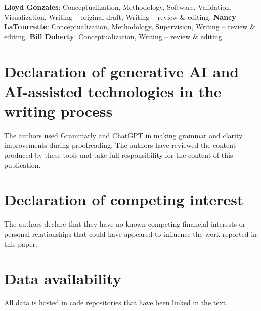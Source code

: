 \documentclass[final,5p,times,twocolumn]{elsarticle}
\begin{document}
\textbf{Lloyd Gonzales}: Conceptualization, Methodology, Software, Validation, Visualization, Writing -- original draft, Writing -- review \& editing. 
\textbf{Nancy LaTourrette}: Conceptualization, Methodology, Supervision, Writing -- review \& editing. 
\textbf{Bill Doherty}: Conceptualization, Writing -- review \& editing.

\section*{Declaration of generative AI and AI-assisted technologies in the writing process}

The authors used Grammarly and ChatGPT in making grammar and clarity improvements
during proofreading. The authors have reviewed the content produced by these tools
and take full responsibility for the content of this publication.

\section*{Declaration of competing interest}

The authors declare that they have no known competing financial interests or
personal relationships that could have appeared to influence the work reported
in this paper.


\section*{Data availability}

All data is hosted in code repositories that have been linked in the text.

\appendix

%  

\end{document}
